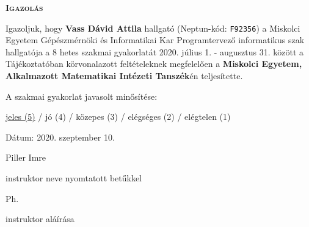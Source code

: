 \documentclass[a4paper, 14pt]{extarticle}
\begin{document}

%
\pagestyle{empty}

\begin{center}
\textbf{\textsc{Igazolás}}
\end{center}

\vskip 1cm

\noindent Igazoljuk, hogy \textbf{Vass Dávid Attila} hallgató (Neptun-kód: \texttt{F92356})
a Miskolci Egyetem Gépészmérnöki és Informatikai Kar Programtervező informatikus szak hallgatója a 8 hetes szakmai gyakorlatát
2020. július 1. - augusztus 31. között a Tájékoztatóban körvonalazott feltételeknek megfelelően a \textbf{Miskolci Egyetem, Alkalmazott Matematikai Intézeti Tanszék}én teljesítette.

\vskip 1cm

\noindent A szakmai gyakorlat javasolt minősítése:

\noindent \underline{jeles (5)} / jó (4) / közepes (3) / elégséges (2) / elégtelen (1)

\vskip 2cm

\noindent Dátum: 2020. szeptember 10.

\vskip 1cm

\hskip 10cm Piller Imre

\hskip 7cm instruktor neve nyomtatott betűkkel

\vskip 1cm

\hskip 2cm Ph.

\vskip 1cm

\hskip 9cm instruktor aláírása
\end{document}
